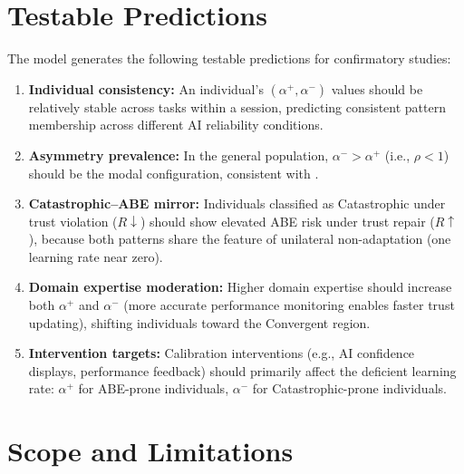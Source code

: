 \documentclass[12pt]{article}
\begin{document}
\section{Testable Predictions}

The model generates the following testable predictions for
confirmatory studies:

\begin{enumerate}
  \item \textbf{Individual consistency:}
    An individual's $(\alpha^+, \alpha^-)$ values should be
    relatively stable across tasks within a session, predicting
    consistent pattern membership across different AI reliability
    conditions.

  \item \textbf{Asymmetry prevalence:}
    In the general population, $\alpha^- > \alpha^+$ (i.e., $\rho < 1$)
    should be the modal configuration, consistent with
    \citet{lee1992trust}.

  \item \textbf{Catastrophic--ABE mirror:}
    Individuals classified as Catastrophic under trust violation
    ($R \downarrow$) should show elevated ABE risk under trust
    repair ($R \uparrow$), because both patterns share the feature
    of unilateral non-adaptation (one learning rate near zero).

  \item \textbf{Domain expertise moderation:}
    Higher domain expertise should increase both $\alpha^+$ and
    $\alpha^-$ (more accurate performance monitoring enables
    faster trust updating), shifting individuals toward the
    Convergent region.

  \item \textbf{Intervention targets:}
    Calibration interventions (e.g., AI confidence displays,
    performance feedback) should primarily affect the deficient
    learning rate: $\alpha^+$ for ABE-prone individuals,
    $\alpha^-$ for Catastrophic-prone individuals.
\end{enumerate}

\section{Scope and Limitations}
\end{document}
